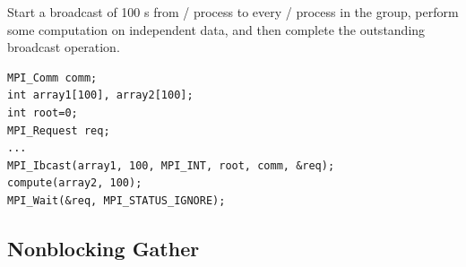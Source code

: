 \begin{example}
\label{nbcoll-exZ}
%
Start a broadcast of 100 s from \MPI/ process  to every \MPI/ process in the
group, perform some computation on independent data, and then complete
the outstanding broadcast operation.

\begin{lstlisting}[language={[MPI]C}]
MPI_Comm comm;
int array1[100], array2[100];
int root=0;
MPI_Request req;
...
MPI_Ibcast(array1, 100, MPI_INT, root, comm, &req);
compute(array2, 100);
MPI_Wait(&req, MPI_STATUS_IGNORE);
\end{lstlisting}
\end{example}


\subsection{Nonblocking Gather}
\label{sec:nbcoll-igather}

